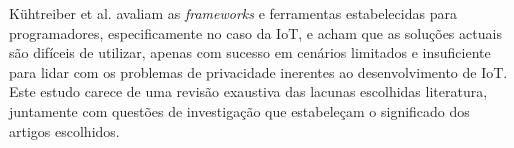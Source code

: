 \documentclass[conference]{IEEEtran}
\begin{document}

Kühtreiber et al. \cite{Kuhtreiber2022survey} avaliam as \textit{frameworks}
e ferramentas estabelecidas para programadores, especificamente no caso da
IoT, e acham que as soluções actuais são difíceis de utilizar, apenas com
sucesso em cenários limitados e insuficiente para lidar com os problemas
de privacidade inerentes ao desenvolvimento de IoT. Este estudo carece de
uma revisão exaustiva das lacunas escolhidas literatura, juntamente com questões
de investigação que estabeleçam o significado dos artigos escolhidos.

\end{document}
